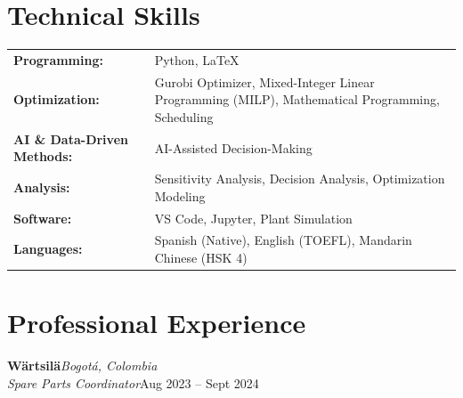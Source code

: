 \documentclass[11pt,a4paper]{article}
\newcommand{\cventry}[4]{%
	\noindent
	\textbf{#1}\hfill\textit{#2}\\
	\textit{#3}\hfill{#4}
	\par\vspace{1pt}
}
\begin{document}
	
	\newpage
	\section{Technical Skills}
	
	\begin{tabularx}{\linewidth}{@{}l X@{}}
		
		\textbf{Programming:}
		&
		Python, \LaTeX
		\\
		
		\textbf{Optimization:}
		&
		Gurobi Optimizer,
		Mixed-Integer Linear Programming (MILP),
		Mathematical Programming,
		Scheduling
		\\
		
		\textbf{AI \& Data-Driven Methods:}
		&
		AI-Assisted Decision-Making
		\\
		
		\textbf{Analysis:}
		&
		Sensitivity Analysis,
		Decision Analysis,
		Optimization Modeling
		\\
		
		\textbf{Software:}
		&
		VS Code,
		Jupyter,
		Plant Simulation
		\\
		
		\textbf{Languages:}
		&
		Spanish (Native),
		English (TOEFL),
		Mandarin Chinese (HSK 4)
		
	\end{tabularx}
	
	

	
	
	
	\section{Professional Experience}
	
	\cventry
	{Wärtsilä}
	{Bogotá, Colombia}
	{Spare Parts Coordinator}
	{Aug 2023 -- Sept 2024}
	
\end{document}
